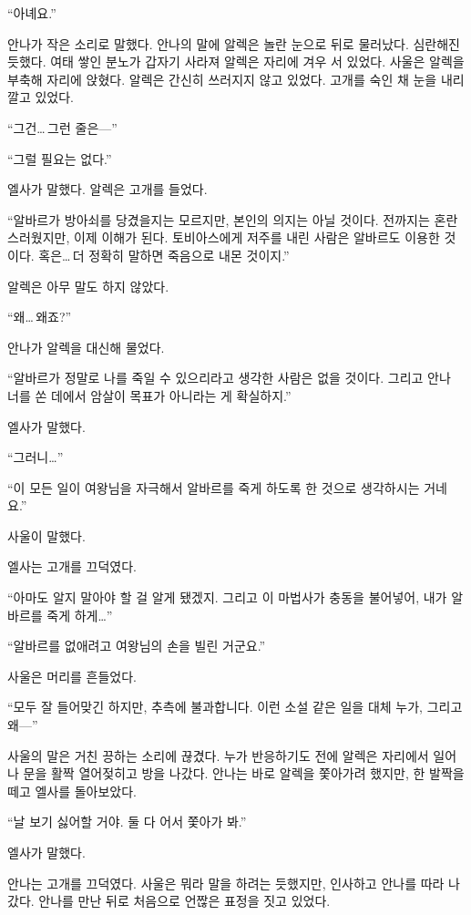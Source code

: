 ``아녜요.''

안나가 작은 소리로 말했다. 안나의 말에 알렉은 놀란 눈으로 뒤로 물러났다. 심란해진 듯했다. 여태 쌓인 분노가 갑자기 사라져 알렉은 자리에 겨우 서 있었다. 사울은 알렉을 부축해 자리에 앉혔다. 알렉은 간신히 쓰러지지 않고 있었다. 고개를 숙인 채 눈을 내리깔고 있었다.

``그건\ldots\,그런 줄은—''

``그럴 필요는 없다.''

엘사가 말했다. 알렉은 고개를 들었다.

``알바르가 방아쇠를 당겼을지는 모르지만, 본인의 의지는 아닐 것이다. 전까지는 혼란스러웠지만, 이제 이해가 된다. 토비아스에게 저주를 내린 사람은 알바르도 이용한 것이다. 혹은\ldots\,더 정확히 말하면 죽음으로 내몬 것이지.''

알렉은 아무 말도 하지 않았다.

``왜\ldots\,왜죠?''

안나가 알렉을 대신해 물었다.

``알바르가 정말로 나를 죽일 수 있으리라고 생각한 사람은 없을 것이다. 그리고 안나 너를 쏜 데에서 암살이 목표가 아니라는 게 확실하지.''

엘사가 말했다.

``그러니\ldots''

``이 모든 일이 여왕님을 자극해서 알바르를 죽게 하도록 한 것으로 생각하시는 거네요.''

사울이 말했다.

엘사는 고개를 끄덕였다.

``아마도 알지 말아야 할 걸 알게 됐겠지. 그리고 이 마법사가 충동을 불어넣어, 내가 알바르를 죽게 하게\ldots''

``알바르를 없애려고 여왕님의 손을 빌린 거군요.''

사울은 머리를 흔들었다.

``모두 잘 들어맞긴 하지만, 추측에 불과합니다. 이런 소설 같은 일을 대체 누가, 그리고 왜—''

사울의 말은 거친 끙하는 소리에 끊겼다. 누가 반응하기도 전에 알렉은 자리에서 일어나 문을 활짝 열어젖히고 방을 나갔다. 안나는 바로 알렉을 쫓아가려 했지만, 한 발짝을 떼고 엘사를 돌아보았다.

``날 보기 싫어할 거야. 둘 다 어서 쫓아가 봐.''

엘사가 말했다.

안나는 고개를 끄덕였다. 사울은 뭐라 말을 하려는 듯했지만, 인사하고 안나를 따라 나갔다. 안나를 만난 뒤로 처음으로 언짢은 표정을 짓고 있었다.

\textbreak

